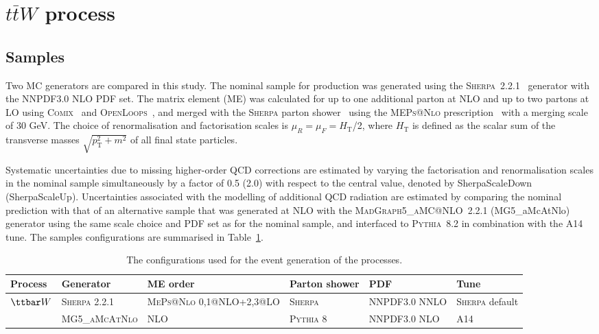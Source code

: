 \section{$t\bar{t}W$ process}
\label{sec:ttV}


\subsection{Samples}
Two MC generators are compared in this study.
The nominal sample for \ttW production was generated using the \textsc{Sherpa}~2.2.1~\cite{sherpa} generator with the NNPDF3.0 NLO PDF set. %
The matrix element (ME) was calculated for up to one additional parton at NLO and up to two partons at LO using
\textsc{Comix}~\cite{Gleisberg:2008fv} and \textsc{OpenLoops}~\cite{Cascioli:2011va}, and merged with the \textsc{Sherpa} parton shower~\cite{Schumann:2007mg} using the \textsc{MEPs@Nlo} prescription~\cite{Hoeche:2012yf} with a merging scale of 30 GeV.
The choice of renormalisation and factorisation scales is $\mu_R = \mu_F = H_\textrm{T}$/2, where $H_\textrm{T}$ is defined as the scalar sum of the transverse masses $\sqrt{p_\textrm{T}^2+m^2}$ of all final state particles.



Systematic uncertainties due to missing higher-order QCD corrections are estimated by varying the factorisation and renormalisation scales in the nominal sample simultaneously by a factor of 0.5 (2.0) with respect to the central value, denoted by SherpaScaleDown (SherpaScaleUp). %
Uncertainties associated with the modelling of additional QCD radiation are estimated by comparing the nominal \ttW prediction with that of an alternative sample that was generated at NLO with the \textsc{MadGraph5\_aMC@NLO}~2.2.1 (MG5\_aMcAtNlo) generator using the same scale choice and PDF set as for the nominal sample, and interfaced to \textsc{Pythia}~8.2 in combination with the A14 tune. 
The samples configurations are summarised in Table~\ref{tab:mcconfig}.
\begin{table}
\begin{center}
\caption{\label{tab:mcconfig}
The configurations used for the event generation of the \ttW processes.}
\vspace{0.25cm}
{\small
\setlength\tabcolsep{1.5pt}
\begin{tabular}{llllll}
\hline\hline
Process & Generator & ME order & Parton shower & PDF & Tune  \\
\hline
$\ttbar W$  & \textsc{Sherpa 2.2.1} & \textsc{MePs@Nlo} 0,1@NLO+2,3@LO & \textsc{Sherpa} &  NNPDF3.0 NNLO & \textsc{Sherpa} default \\
& \textsc{MG5\_aMcAtNlo} & NLO & \textsc{Pythia} 8 & NNPDF3.0 NLO & A14   \\
\hline\hline
\end{tabular}
}
\end{center}
\end{table}



